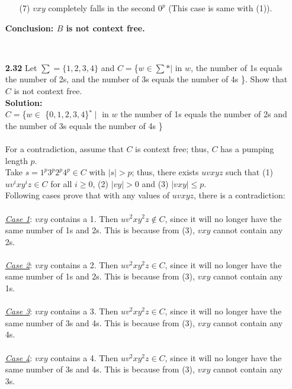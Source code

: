 \documentclass[12pt]{letter}
\begin{document}
\begin{enumerate}
\begin{enumerate}
			\item[(7)] $vxy$ completely falls in the second $0^p$  (This case is same with (1)). \\

		\end{enumerate}
\textbf{Conclusion: $B$ is not context free.}

\ \\ %
\item[\textbf{2.32}] Let $\sum = \{1, 2, 3, 4\}$ and $C = $\{$w \in \sum * |$ in $w$, the number of 1s equals the number of 2s, and the number of 3s equals the number of 4s \}. Show that $C$ is not context free.
\leavevmode \\
\textbf{Solution:} \\
$C =$\{$w \in$ \{$0, 1, 2, 3, 4$\}$^* \mid $ in $w$ the number of 1s equals the number of 2s and the number of 3s equals the number of 4s \} \\

\leavevmode \\
For a contradiction, assume that $C$ is context free; thus, $C$ has a pumping length $p$. \\
Take $s = 1^p3^p2^p4^p \in C$ with $|s| > p$; thus, there exists $uvxyz$ such that (1) $uv^ixy^iz \in C$ for all $i \geq 0$, (2) $|vy| > 0$ and (3) $|vxy| \leq p$. \\
Following cases prove that with any values of $uvxyz$, there is a contradiction: \\

\leavevmode \\
\underline{\textit{Case 1}}: $vxy$ contains a 1. Then $uv^2xy^2z \notin C$, since it will no longer have the same number of 1s and 2s. This is because from (3), $vxy$ cannot contain any 2s. \\

\leavevmode \\
\underline{\textit{Case 2}}: $vxy$ contains a 2. Then $uv^2xy^2z \in C$, since it will no longer have the same number of 1s and 2s. This is because from (3), $vxy$ cannot contain any 1s. \\

\leavevmode \\
\underline{\textit{Case 3}}: $vxy$ contains a 3. Then $uv^2xy^2z \in C$, since it will no longer have the same number of 3s and 4s. This is because from (3), $vxy$ cannot contain any 4s. \\

\leavevmode \\
\underline{\textit{Case 4}}: $vxy$ contains a 4. Then $uv^2xy^2z \in C$, since it will no longer have the same number of 3s and 4s. This is because from (3), $vxy$ cannot contain any 3s. \\


\end{enumerate}
\end{document}
